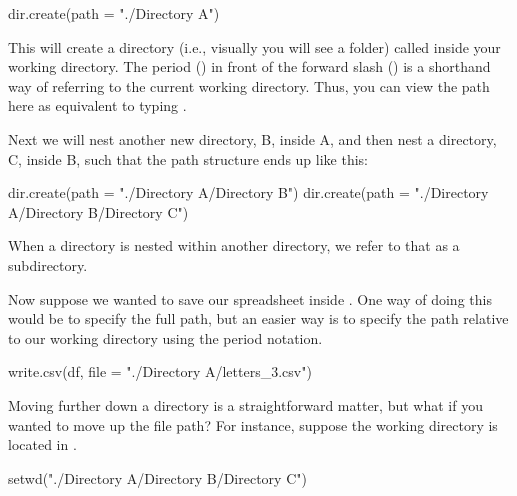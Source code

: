 \begin{inR}
dir.create(path = "./Directory A")
\end{inR}

\vspace{1em}

\noindent
This will create a directory (i.e., visually you will see a folder) called  inside your working directory. The period () in front of the forward slash (\R{/}) is a shorthand way of referring to the current working directory. Thus, you can view the path here as equivalent to typing .

Next we will nest another new directory, B, inside A, and then nest a directory, C, inside B, such that the path structure ends up like this:

\vspace{1em}


\begin{inR}
dir.create(path = "./Directory A/Directory B")
dir.create(path = "./Directory A/Directory B/Directory C")
\end{inR}

\medskip
\noindent
When a directory is nested within another directory, we refer to that as a \gls{subdirectory}.

Now suppose we wanted to save our spreadsheet inside . One way of doing this would be to specify the full path, but an easier way is to specify the path relative to our working directory using the period notation.

\begin{inR}
write.csv(df, file = "./Directory A/letters_3.csv")
\end{inR}

\vspace{2em}


Moving further down a directory is a straightforward matter, but what if you wanted to move up the file path? For instance, suppose the working directory is located in .

\begin{inR}
setwd("./Directory A/Directory B/Directory C")
\end{inR}

